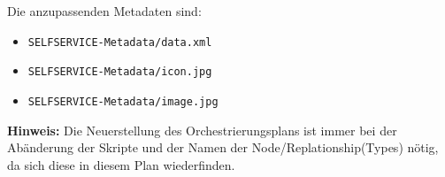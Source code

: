Die anzupassenden Metadaten sind:
\begin{itemize}
    \item \texttt{SELFSERVICE-Metadata/data.xml}
    \item \texttt{SELFSERVICE-Metadata/icon.jpg}
    \item \texttt{SELFSERVICE-Metadata/image.jpg}
\end{itemize}

\textbf{Hinweis:} Die Neuerstellung des Orchestrierungsplans ist immer bei der Abänderung der Skripte und der Namen der Node/Replationship(Types) nötig, da sich diese in diesem Plan wiederfinden.
